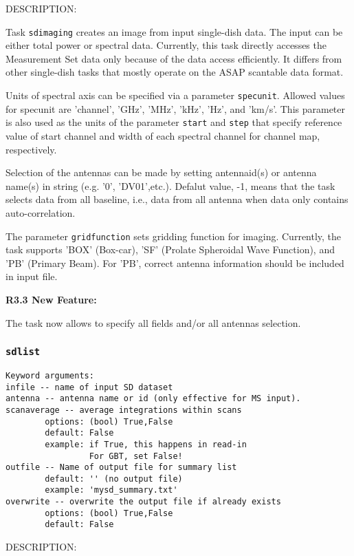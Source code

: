 DESCRIPTION:

Task {\tt sdimaging} creates an image from input single-dish data.
The input can be either total power or spectral data. Currently,
this task directly accesses the Measurement Set data only because of 
the data access efficiently. It differs from other single-dish tasks 
that mostly operate on the ASAP scantable data format.
 
Units of spectral axis can be specified via a parameter {\tt specunit}.
Allowed values for specunit are 'channel', 'GHz', 'MHz', 'kHz', 'Hz', 
and 'km/s'. This parameter is also used as the units of the parameter 
{\tt start} and {\tt step} that specify reference value of start channel and width 
of each spectral channel for channel map, respectively.

Selection of the antennas can be made by setting antennaid(s) or 
antenna name(s) in string (e.g. '0', 'DV01',etc.). Defalut value, -1, means 
that the task selects data from all baseline, i.e., data from all antenna when 
data only contains auto-correlation.

The parameter {\tt gridfunction} sets gridding function for imaging. 
Currently, the task supports 'BOX' (Box-car), 'SF' (Prolate Spheroidal 
Wave Function), and 'PB' (Primary Beam). For 'PB', correct antenna 
information should be included in input file. 

\medskip
{\bf R3.3 New Feature:}

The task now allows to specify all fields and/or all antennas selection.
 

\subsubsection{{\tt sdlist}}
\label{section:sd.sdtasks.tasks.sdlist}

\begin{verbatim}
Keyword arguments:
infile -- name of input SD dataset
antenna -- antenna name or id (only effective for MS input). 
scanaverage -- average integrations within scans
        options: (bool) True,False
        default: False
        example: if True, this happens in read-in
                 For GBT, set False!
outfile -- Name of output file for summary list
        default: '' (no output file)
        example: 'mysd_summary.txt'
overwrite -- overwrite the output file if already exists
        options: (bool) True,False
        default: False
\end{verbatim}
    
DESCRIPTION:
    

